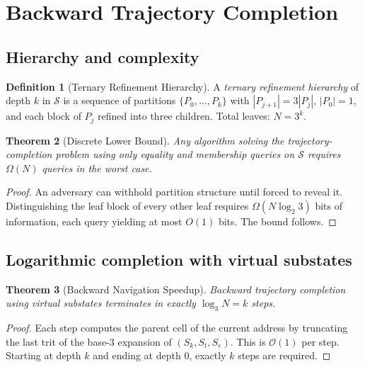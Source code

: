 \documentclass[twocolumn,10pt,a4paper]{article}
\theoremstyle{thmstyle}
\newtheorem{theorem}{Theorem}[section]
\theoremstyle{definition}
\newtheorem{definition}[theorem]{Definition}
\theoremstyle{remark}
\newcommand{\Sspace}{\mathcal{S}}
\begin{document}
\section{Backward Trajectory Completion}
\label{sec:backward}

\subsection{Hierarchy and complexity}

\begin{definition}[Ternary Refinement Hierarchy]
\label{def:hier}
A \emph{ternary refinement hierarchy} of depth $k$ in $\Sspace$ is a
sequence of partitions $\{P_{0},\ldots,P_{k}\}$ with
$|P_{j+1}|=3|P_{j}|$, $|P_{0}|=1$, and each block of $P_{j}$ refined
into three children. Total leaves: $N=3^{k}$.
\end{definition}

\begin{theorem}[Discrete Lower Bound]
\label{thm:lower}
Any algorithm solving the trajectory-completion problem using only
equality and membership queries on $\Sspace$ requires $\Omega(N)$
queries in the worst case.
\end{theorem}

\begin{proof}
An adversary can withhold partition structure until forced to reveal
it. Distinguishing the leaf block of every other leaf requires
$\Omega(N\log_{2}3)$ bits of information, each query yielding at most
$O(1)$ bits. The bound follows.
\end{proof}

\subsection{Logarithmic completion with virtual substates}

\begin{theorem}[Backward Navigation Speedup]
\label{thm:logn}
Backward trajectory completion using virtual substates terminates in
exactly $\log_{3}N=k$ steps.
\end{theorem}

\begin{proof}
Each step computes the parent cell of the current address by
truncating the last trit of the base-3 expansion of $(S_{k},S_{t},S_{e})$.
This is $\mathcal{O}(1)$ per step. Starting at depth $k$ and ending
at depth $0$, exactly $k$ steps are required.
\end{proof}
\end{document}
